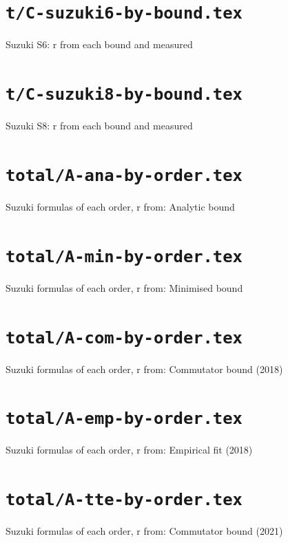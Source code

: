 \documentclass{article}
\begin{document}
\section*{\texttt{t/C-suzuki6-by-bound.tex}}
Suzuki S6: r from each bound and measured\par\medskip

\clearpage

\section*{\texttt{t/C-suzuki8-by-bound.tex}}
Suzuki S8: r from each bound and measured\par\medskip

\clearpage

\section*{\texttt{total/A-ana-by-order.tex}}
Suzuki formulas of each order, r from: Analytic bound\par\medskip

\clearpage

\section*{\texttt{total/A-min-by-order.tex}}
Suzuki formulas of each order, r from: Minimised bound\par\medskip

\clearpage

\section*{\texttt{total/A-com-by-order.tex}}
Suzuki formulas of each order, r from: Commutator bound (2018)\par\medskip

\clearpage

\section*{\texttt{total/A-emp-by-order.tex}}
Suzuki formulas of each order, r from: Empirical fit (2018)\par\medskip

\clearpage

\section*{\texttt{total/A-tte-by-order.tex}}
Suzuki formulas of each order, r from: Commutator bound (2021)\par\medskip

\clearpage
\end{document}

